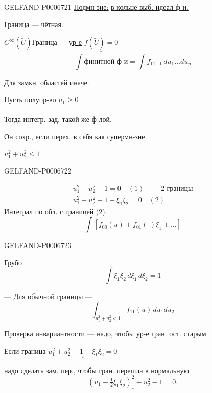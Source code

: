 \begin{GelfandAdjacentEvidence}{GELFAND-P000672}{1}
\underline{\underline{Подмн-зие:}} \underline{в кольце выб. идеал ф-и.}

Граница --- \underline{чётная}.

\(C^\infty(\widetilde U)\)\qquad Граница --- \underline{ур-е}
\(\underline{\underline{f(\widetilde U)=0}}\)
\[
\int \text{финитной ф-и}=\int f_{11\ldots1}\,du_1\ldots du_p
\]

\underline{Для замкн. областей иначе.}

Пусть полупр-во \(\underline{\underline{u_1\ge0}}\)

Тогда интегр. зад. такой же ф-лой.

Он сохр., если перех. в себя как супермн-зие.

\(u_1^2+u_2^2\le1\)
\end{GelfandAdjacentEvidence}
\begin{GelfandAdjacentEvidence}{GELFAND-P000672}{2}

\[
\begin{gathered}
u_1^2+u_2^2-1=0\quad(1)\quad\text{--- 2 границы}\\
u_1^2+u_2^2-1-\xi_1\xi_2=0\quad(2)
\end{gathered}
\]
Интеграл по обл. с границей (2).
\[
\int[f_{00}(u)+f_{01}(\ )\xi_1+\ldots]
\]
\end{GelfandAdjacentEvidence}
\begin{GelfandAdjacentEvidence}{GELFAND-P000672}{3}


\underline{Грубо}
\[
\int\xi_1\xi_2\,d\xi_1\,d\xi_2=1
\]

--- Для обычной границы ---
\[
\int_{u_1^2+u_2^2<1}f_{11}(u)\,du_1du_2
\]

\underline{Проверка инвариантности} --- надо, чтобы ур-е гран. ост. старым.

Если граница \(\underline{u_1^2+u_2^2-1-\xi_1\xi_2=0}\)

надо сделать зам. пер., чтобы гран. перешла в нормальную
\[
\underline{\left(u_1-\tfrac12\xi_1\xi_2\right)^2+u_2^2-1=0.}
\]
\end{GelfandAdjacentEvidence}
